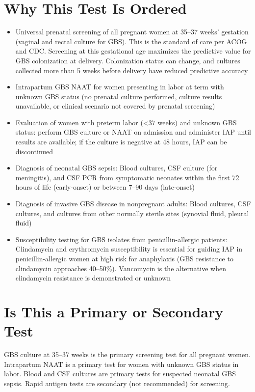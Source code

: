 \section*{Why This Test Is Ordered}
\begin{itemize}
  \item Universal prenatal screening of all pregnant women at 35--37 weeks' gestation (vaginal and rectal culture for GBS). This is the standard of care per ACOG and CDC. Screening at this gestational age maximizes the predictive value for GBS colonization at delivery. Colonization status can change, and cultures collected more than 5 weeks before delivery have reduced predictive accuracy
  \item Intrapartum GBS NAAT for women presenting in labor at term with unknown GBS status (no prenatal culture performed, culture results unavailable, or clinical scenario not covered by prenatal screening)
  \item Evaluation of women with preterm labor (<37 weeks) and unknown GBS status: perform GBS culture or NAAT on admission and administer IAP until results are available; if the culture is negative at 48 hours, IAP can be discontinued
  \item Diagnosis of neonatal GBS sepsis: Blood cultures, CSF culture (for meningitis), and CSF PCR from symptomatic neonates within the first 72 hours of life (early-onset) or between 7--90 days (late-onset)
  \item Diagnosis of invasive GBS disease in nonpregnant adults: Blood cultures, CSF cultures, and cultures from other normally sterile sites (synovial fluid, pleural fluid)
  \item Susceptibility testing for GBS isolates from penicillin-allergic patients: Clindamycin and erythromycin susceptibility is essential for guiding IAP in penicillin-allergic women at high risk for anaphylaxis (GBS resistance to clindamycin approaches 40--50\%). Vancomycin is the alternative when clindamycin resistance is demonstrated or unknown
\end{itemize}

\section*{Is This a Primary or Secondary Test}
GBS culture at 35--37 weeks is the primary screening test for all pregnant women. Intrapartum NAAT is a primary test for women with unknown GBS status in labor. Blood and CSF cultures are primary tests for suspected neonatal GBS sepsis. Rapid antigen tests are secondary (not recommended) for screening.

